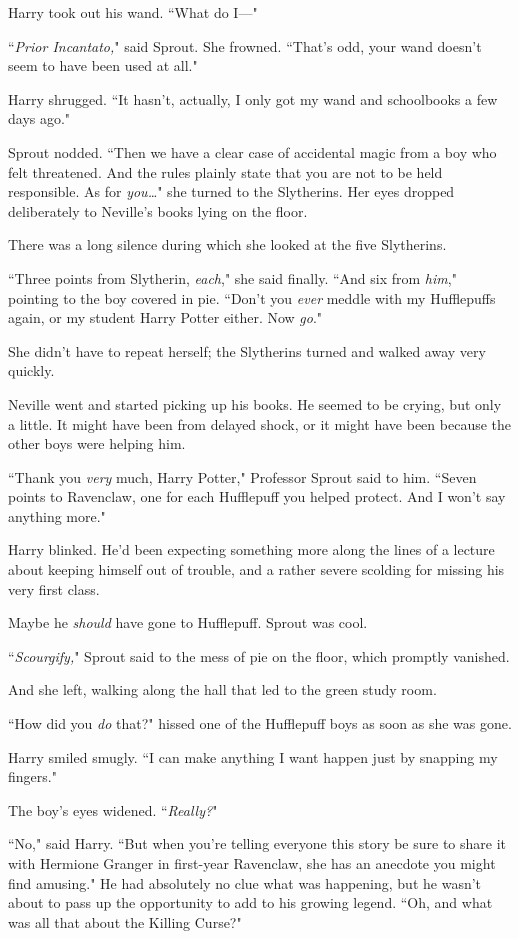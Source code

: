 Harry took out his wand. ``What do I—"

``\emph{Prior Incantato,}" said Sprout. She frowned. ``That's odd, your wand doesn't seem to have been used at all."

Harry shrugged. ``It hasn't, actually, I only got my wand and schoolbooks a few days ago."

Sprout nodded. ``Then we have a clear case of accidental magic from a boy who felt threatened. And the rules plainly state that you are not to be held responsible. As for \emph{you…}" she turned to the Slytherins. Her eyes dropped deliberately to Neville's books lying on the floor.

There was a long silence during which she looked at the five Slytherins.

``Three points from Slytherin, \emph{each}," she said finally. ``And six from \emph{him}," pointing to the boy covered in pie. ``Don't you \emph{ever} meddle with my Hufflepuffs again, or my student Harry Potter either. Now \emph{go}."

She didn't have to repeat herself; the Slytherins turned and walked away very quickly.

Neville went and started picking up his books. He seemed to be crying, but only a little. It might have been from delayed shock, or it might have been because the other boys were helping him.

``Thank you \emph{very} much, Harry Potter," Professor Sprout said to him. ``Seven points to Ravenclaw, one for each Hufflepuff you helped protect. And I won't say anything more."

Harry blinked. He'd been expecting something more along the lines of a lecture about keeping himself out of trouble, and a rather severe scolding for missing his very first class.

Maybe he \emph{should} have gone to Hufflepuff. Sprout was cool.

``\emph{Scourgify,}" Sprout said to the mess of pie on the floor, which promptly vanished.

And she left, walking along the hall that led to the green study room.

``How did you \emph{do} that?" hissed one of the Hufflepuff boys as soon as she was gone.

Harry smiled smugly. ``I can make anything I want happen just by snapping my fingers."

The boy's eyes widened. ``\emph{Really?}"

``No," said Harry. ``But when you're telling everyone this story be sure to share it with Hermione Granger in first-year Ravenclaw, she has an anecdote you might find amusing." He had absolutely no clue what was happening, but he wasn't about to pass up the opportunity to add to his growing legend. ``Oh, and what was all that about the Killing Curse?"

